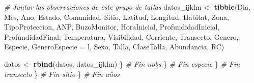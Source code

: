\documentclass[]{krantz}
\newenvironment{Shaded}{\begin{snugshade}}{\end{snugshade}}
\newcommand{\CommentTok}[1]{\textcolor[rgb]{0.56,0.35,0.01}{\textit{#1}}}
\newcommand{\DataTypeTok}[1]{\textcolor[rgb]{0.13,0.29,0.53}{#1}}
\newcommand{\KeywordTok}[1]{\textcolor[rgb]{0.13,0.29,0.53}{\textbf{#1}}}
\newcommand{\NormalTok}[1]{#1}
\newcommand{\StringTok}[1]{\textcolor[rgb]{0.31,0.60,0.02}{#1}}
\begin{document}
\begin{Shaded}
\begin{Highlighting}[]
{          \CommentTok{# Juntar las observaciones de este grupo de tallas}
\NormalTok{          datos_ijklm <-}\StringTok{ }\KeywordTok{tibble}\NormalTok{(Dia,}
\NormalTok{                                Mes,}
\NormalTok{                                Ano,}
\NormalTok{                                Estado,}
\NormalTok{                                Comunidad,}
\NormalTok{                                Sitio,}
\NormalTok{                                Latitud,}
\NormalTok{                                Longitud,}
\NormalTok{                                Habitat,}
\NormalTok{                                Zona,}
\NormalTok{                                TipoProteccion,}
\NormalTok{                                ANP,}
\NormalTok{                                BuzoMonitor, }
\NormalTok{                                HoraInicial,}
\NormalTok{                                ProfundidadInicial,}
\NormalTok{                                ProfundidadFinal,}
\NormalTok{                                Temperatura,}
\NormalTok{                                Visibilidad,}
\NormalTok{                                Corriente,}
\NormalTok{                                Transecto,}
\NormalTok{                                Genero,}
\NormalTok{                                Especie,}
                                \DataTypeTok{GeneroEspecie =}\NormalTok{ l,}
\NormalTok{                                Sexo,}
\NormalTok{                                Talla,}
\NormalTok{                                ClaseTalla,}
\NormalTok{                                Abundancia,}
\NormalTok{                                RC)}
          
\NormalTok{          datos <-}\StringTok{ }\KeywordTok{rbind}\NormalTok{(datos, datos_ijklm)}
\NormalTok{        \} }\CommentTok{# Fin nobs}
\NormalTok{      \} }\CommentTok{# Fin especie}
\NormalTok{    \} }\CommentTok{# Fin transecto}
\NormalTok{  \} }\CommentTok{# Fin sitio}
\NormalTok{\} }\CommentTok{# Fin años}

}
\end{Highlighting}
\end{Shaded}
\end{document}

